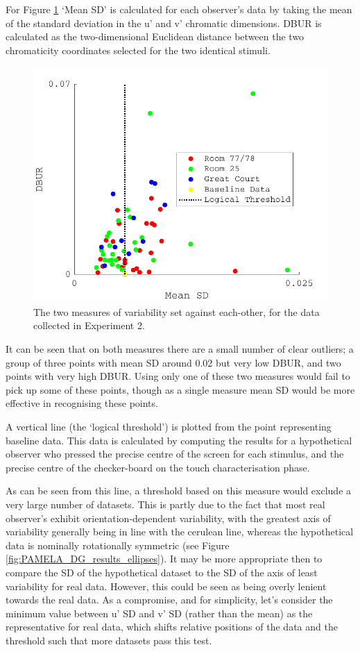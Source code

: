 For Figure \ref{fig:excl1} `Mean SD' is calculated for each observer's data by taking the mean of the standard deviation in the u' and v' chromatic dimensions. \gls{DBUR} is calculated as the two-dimensional Euclidean distance between the two chromaticity coordinates selected for the two identical stimuli.

\begin{figure}[hbtp] 
\includegraphics[max width=\textwidth]{figs/tablet/excl1.pdf} 
\caption{The two measures of variability set against each-other, for the data collected in Experiment 2.}
\label{fig:excl1}
\end{figure}

It can be seen that on both measures there are a small number of clear outliers; a group of three points with mean SD around 0.02 but very low \gls{DBUR}, and two points with very high \gls{DBUR}. Using only one of these two measures would fail to pick up some of these points, though as a single measure mean SD would be more effective in recognising these points.

A vertical line (the `logical threshold') is plotted from the point representing baseline data. This data is calculated by computing the results for a hypothetical observer who pressed the precise centre of the screen for each stimulus, and the precise centre of the checker-board on the touch characterisation phase. 

As can be seen from this line, a threshold based on this measure would exclude a very large number of datasets. This is partly due to the fact that most real observer's exhibit orientation-dependent variability, with the greatest axis of variability generally being in line with the cerulean line, whereas the hypothetical data is nominally rotationally symmetric (see Figure \ref{fig:PAMELA_DG_results_ellipses}). It may be more appropriate then to compare the SD of the hypothetical dataset to the SD of the axis of least variability for real data. However, this could be seen as being overly lenient towards the real data. As a compromise, and for simplicity, let's consider the minimum value between u' SD and v' SD (rather than the mean) as the representative for real data, which shifts relative positions of the data and the threshold such that more datasets pass this test. 

